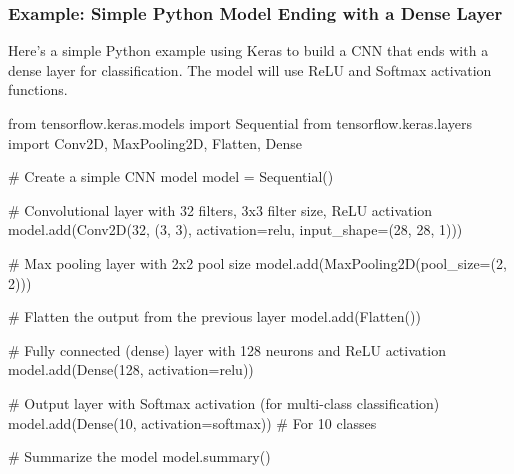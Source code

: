\documentclass[
  letterpaper,
  DIV=11,
  numbers=noendperiod]{scrreprt}
\newenvironment{Shaded}{\begin{snugshade}}{\end{snugshade}}
\newcommand{\CommentTok}[1]{\textcolor[rgb]{0.37,0.37,0.37}{#1}}
\newcommand{\DecValTok}[1]{\textcolor[rgb]{0.68,0.00,0.00}{#1}}
\newcommand{\ImportTok}[1]{\textcolor[rgb]{0.00,0.46,0.62}{#1}}
\newcommand{\NormalTok}[1]{\textcolor[rgb]{0.00,0.23,0.31}{#1}}
\newcommand{\OperatorTok}[1]{\textcolor[rgb]{0.37,0.37,0.37}{#1}}
\newcommand{\StringTok}[1]{\textcolor[rgb]{0.13,0.47,0.30}{#1}}
\begin{document}
\subsubsection{Example: Simple Python Model Ending with a Dense
Layer}\label{example-simple-python-model-ending-with-a-dense-layer}

Here's a simple Python example using Keras to build a CNN that ends with
a dense layer for classification. The model will use ReLU and Softmax
activation functions.

\begin{Shaded}
\begin{Highlighting}[]
\ImportTok{from}\NormalTok{ tensorflow.keras.models }\ImportTok{import}\NormalTok{ Sequential}
\ImportTok{from}\NormalTok{ tensorflow.keras.layers }\ImportTok{import}\NormalTok{ Conv2D, MaxPooling2D, Flatten, Dense}

\CommentTok{\# Create a simple CNN model}
\NormalTok{model }\OperatorTok{=}\NormalTok{ Sequential()}

\CommentTok{\# Convolutional layer with 32 filters, 3x3 filter size, ReLU activation}
\NormalTok{model.add(Conv2D(}\DecValTok{32}\NormalTok{, (}\DecValTok{3}\NormalTok{, }\DecValTok{3}\NormalTok{), activation}\OperatorTok{=}\StringTok{\textquotesingle{}relu\textquotesingle{}}\NormalTok{, input\_shape}\OperatorTok{=}\NormalTok{(}\DecValTok{28}\NormalTok{, }\DecValTok{28}\NormalTok{, }\DecValTok{1}\NormalTok{)))}

\CommentTok{\# Max pooling layer with 2x2 pool size}
\NormalTok{model.add(MaxPooling2D(pool\_size}\OperatorTok{=}\NormalTok{(}\DecValTok{2}\NormalTok{, }\DecValTok{2}\NormalTok{)))}

\CommentTok{\# Flatten the output from the previous layer}
\NormalTok{model.add(Flatten())}

\CommentTok{\# Fully connected (dense) layer with 128 neurons and ReLU activation}
\NormalTok{model.add(Dense(}\DecValTok{128}\NormalTok{, activation}\OperatorTok{=}\StringTok{\textquotesingle{}relu\textquotesingle{}}\NormalTok{))}

\CommentTok{\# Output layer with Softmax activation (for multi{-}class classification)}
\NormalTok{model.add(Dense(}\DecValTok{10}\NormalTok{, activation}\OperatorTok{=}\StringTok{\textquotesingle{}softmax\textquotesingle{}}\NormalTok{))  }\CommentTok{\# For 10 classes}

\CommentTok{\# Summarize the model}
\NormalTok{model.summary()}
\end{Highlighting}
\end{Shaded}
\end{document}
